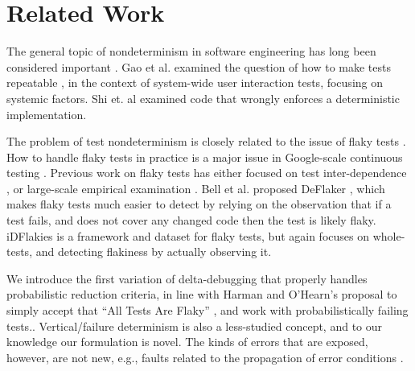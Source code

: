 \section{Related Work}

The general topic of nondeterminism in software engineering has long been considered important  \cite{Unknowns,UncertaintyPrinciple}. 
Gao et al. examined the question of how to make tests repeatable \cite{Gao:2015:MSU:2818754.2818764}, in the context of system-wide user interaction tests, focusing on systemic factors.  
Shi et. al \cite{DetermImp} examined code that wrongly enforces a deterministic implementation.  %

The problem of test nondeterminism is closely related to the issue of flaky tests \cite{miccoflaky, luo2014empirical,palomba2017does,listfieldtestanalysis}.  How to handle flaky tests in practice is a major issue in Google-scale continuous testing \cite{memon2017taming}.
Previous work on flaky tests has either focused on test inter-dependence \cite{LamZE2015}, or large-scale empirical examination \cite{luo2014empirical,palomba2017does}.  
Bell et al. proposed DeFlaker \cite{bell2018d}, which makes flaky tests much easier to detect by relying on the observation that if a test fails, and does not cover any changed code then the test is likely flaky.   iDFlakies \cite{idflakies} is a framework and dataset for flaky tests, but again focuses on whole-tests, and detecting flakiness by actually observing it. 

We introduce the first variation of
delta-debugging that properly handles probabilistic reduction criteria, in line with Harman and O'Hearn's proposal to simply accept that ``All Tests Are Flaky'' \cite{StartupstoScaleups}, and work with probabilistically failing tests..
Vertical/failure determinism is also a less-studied concept, and to our knowledge our formulation is novel. The kinds of errors that are exposed, however, are not new, e.g., faults related to the propagation of error conditions \cite{FileProp}.


